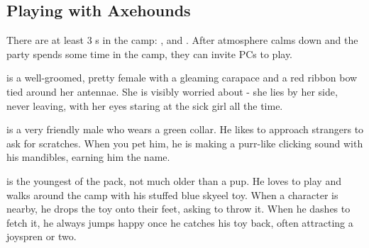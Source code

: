 
\subsection{Playing with Axehounds}

There are at least 3 \enemyAxehound{}s in the camp: \npcHoundLady{}, \npcHoundFetch{} and \npcHoundScratch{}. After atmosphere calms down and the party spends some time in the camp, they can invite PCs to play.

\npcHoundLady{} is a well-groomed, pretty female \enemyAxehound{} with a gleaming carapace and a red ribbon bow tied around her antennae. She is visibly worried about \npcSickGirl{} - she lies by her side, never leaving, with her eyes staring at the sick girl all the time.

\npcHoundScratch{} is a very friendly male \enemyAxehound{} who wears a green collar. He likes to approach strangers to ask for scratches. When you pet him, he is making a purr-like clicking sound with his mandibles, earning him the name.

\npcHoundFetch{} is the youngest of the pack, not much older than a pup. He loves to play and walks around the camp with his stuffed blue skyeel toy. When a character is nearby, he drops the toy onto their feet, asking to throw it. When he dashes to fetch it, he always jumps happy once he catches his toy back, often attracting a joyspren or two.

